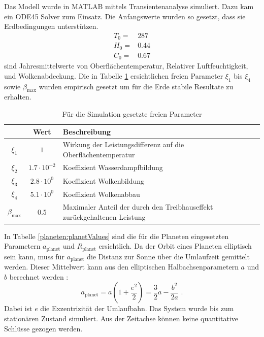 \begin{refsection}
Das Modell wurde in MATLAB mittels Transientenanalyse simuliert. Dazu kam ein ODE45 Solver zum Einsatz. Die Anfangswerte wurden so gesetzt, dass sie Erdbedingungen unterstützen.
\begin{equation}
\begin{matrix}
T_0 = & 287 \\
H_0 = & 0.44 \\
C_0 = & 0.67
\end{matrix}
\end{equation}sind Jahresmittelwerte von Oberflächentemperatur, Relativer Luftfeuchtigkeit, und Wolkenabdeckung.
Die in Tabelle \ref{planeten:xiValues} ersichtlichen freien Parameter $\xi_1$ bis $\xi_4$ sowie $\beta_{\text{max}}$ wurden empirisch gesetzt um für die Erde stabile Resultate zu erhalten.
\begin{center}
\begin{table}[!h]
	\center
	\begin{tabular}{c|c|l}
        & Wert                  & Beschreibung \\
  \hline
$\xi_1$ & $1$					& Wirkung der Leistungsdifferenz auf die Oberflächentemperatur\\
$\xi_2$ & $1.7 \cdot 10^{-2}$	& Koeffizient Wasserdampfbildung\\
$\xi_3$ & $2.8 \cdot 10^{0}$	& Koeffizient Wolkenbildung \\
$\xi_4$ & $5.1 \cdot 10^{0}$	& Koeffizient Wolkenabbau \\
$\beta_{\text{max}}$ & $0.5$	& Maximaler Anteil der durch den Treibhauseffekt zurückgehaltenen Leistung
	\end{tabular}
	\caption{Für die Simulation gesetzte freien Parameter}
	\label{planeten:xiValues}
\end{table}
\end{center}
In Tabelle \ref{planeten:planetValues} sind die für die Planeten eingesetzten Parametern $a_{\text{planet}}$ und $R_{\text{planet}}$ ersichtlich. Da der Orbit eines Planeten elliptisch sein kann, muss für $a_{\text{planet}}$ die Distanz zur Sonne über die Umlaufzeit gemittelt werden. Dieser Mittelwert kann aus den elliptischen Halbachsenparametern $a$ und $b$ berechnet werden \cite{planeten:umlaufbahn}:
\begin{equation}
a_{\text{planet}} = a \left(1+{\frac {e^{2}}{2}}\right) = \frac{3}{2}a - \frac{b^2}{2a} \text{ .}
\end{equation}
Dabei ist $e$ die Exzentrizität der Umlaufbahn.
Das System wurde bis zum stationären Zustand simuliert. Aus der Zeitachse können keine quantitative Schlüsse gezogen werden.

\end{refsection}
